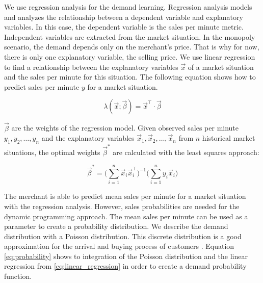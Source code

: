 We use regression analysis for the demand learning.
Regression analysis models and analyzes the relationship between a dependent variable and explanatory variables.
In this case, the dependent variable is the sales per minute metric.
Independent variables are extracted from the market situation.
In the monopoly scenario, the demand depends only on the merchant's price.
That is why for now, there is only one explanatory variable, the selling price.
We use linear regression to find a relationship between the explanatory variables $\vec{x}$ of a market situation and the sales per minute for this situation.
The following equation shows how to predict sales per minute $y$ for a market situation.

\begin{equation}
\label{eq:linear_regression}
\lambda(\vec{x}; \vec{\beta}) = \vec{x}^\intercal \cdot \vec{\beta}
\end{equation}

$\vec{\beta}$ are the weights of the regression model.
Given observed sales per minute $y_1, y_2, \ldots, y_n$ and the explanatory variables $\vec{x}_1, \vec{x}_2, \ldots, \vec{x}_n$ from $n$ historical market situations, the optimal weights $\vec{\beta}^*$ are calculated with the least squares approach:

\begin{equation}
\vec{\beta}^* = \bigg(\sum_{i=1}^n{\vec{x}_i \vec{x}_i^\intercal} \bigg)^{-1}
			  \bigg(\sum_{i=1}^n{y_i \vec{x}_i} \bigg)
\end{equation}

The merchant is able to predict mean sales per minute for a market situation with the regression analysis.
However, sales probabilities are needed for the dynamic programming approach.
The mean sales per minute can be used as a parameter to create a probability distribution.
We describe the demand distribution with a Poisson distribution.
This discrete distribution is a good approximation for the arrival and buying process of customers \cite{DBLP:journals/ior/Wolff82}.
Equation \ref{eq:probability} shows to integration of the Poisson distribution and the linear regression from \cref{eq:linear_regression} in order to create a demand probability function.

